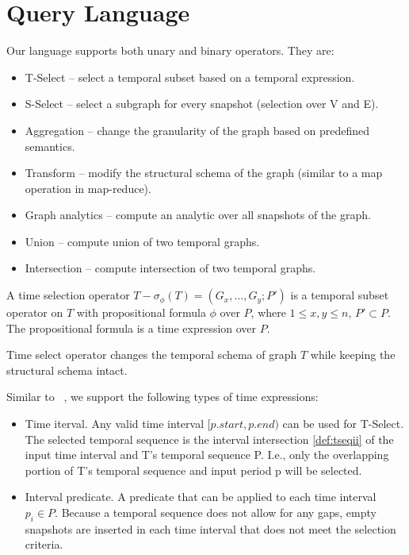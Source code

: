 \section{Query Language}
\label{sec:lang}

Our language supports both unary and binary operators. They are:
\begin{itemize}
\item T-Select -- select a temporal subset based on a temporal expression.
\item S-Select -- select a subgraph for every snapshot (selection over V and E).
\item Aggregation -- change the granularity of the graph based on predefined semantics.
\item Transform -- modify the structural schema of the graph (similar to a map operation in map-reduce).
\item Graph analytics -- compute an analytic over all snapshots of the graph.
\item Union -- compute union of two temporal graphs.
\item Intersection -- compute intersection of two temporal graphs.
\end{itemize}

\begin{definition} [T-Select]
\label{def:tsel}
A time selection operator $T-\sigma_\phi(T) = (G_x, \ldots, G_y; P')$ is
a temporal subset operator on $T$ with propositional formula $\phi$
over $P$, where $1 \leq x,y \leq n$, $P' \subset P$.  The
propositional formula is a time expression over $P$.
\end{definition}

Time select operator changes the temporal schema of graph $T$ while
keeping the structural schema intact.

Similar to ~\cite{Khurana2013}, we support the following types of time expressions:

\begin{itemize}

\item Time iterval.  Any valid time interval $[p.start,p.end)$ can be
  used for T-Select.  The selected temporal sequence is the interval
  intersection \ref{def:tseqii} of the input time interval and T's
  temporal sequence P.  I.e., only the overlapping portion of T's
  temporal sequence and input period p will be selected.

\item Interval predicate.  A predicate that can be applied to each
  time interval $p_i \in P$.  Because a temporal sequence does not
  allow for any gaps, empty snapshots are inserted in each time
  interval that does not meet the selection criteria.  

\end{itemize}

